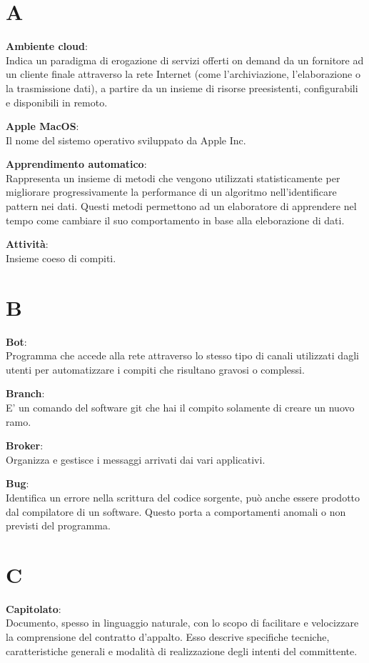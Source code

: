 \documentclass[a4paper, oneside, openany, dvipsnames, table]{article}
\begin{document}
\copertina{}


\newpage
\tableofcontents
\newpage


\newpage
\section{A}
\textbf{Ambiente cloud}:\\	 Indica un paradigma di erogazione di servizi offerti on demand da un fornitore ad un cliente finale attraverso la rete Internet (come l'archiviazione, l'elaborazione o la trasmissione dati), a partire da un insieme di risorse preesistenti, configurabili e disponibili in remoto.

\textbf{Apple MacOS}:\\Il nome del sistemo operativo sviluppato da Apple Inc.

\textbf{Apprendimento automatico}:\\	Rappresenta un insieme di metodi che vengono utilizzati statisticamente per migliorare progressivamente la performance di un algoritmo nell'identificare pattern nei dati. Questi metodi  permettono ad un elaboratore di apprendere nel tempo come cambiare il suo comportamento in base alla eleborazione di dati.

\textbf{Attività}:\\	Insieme coeso di compiti.


\newpage
\section{B}
\textbf{Bot}:\\	Programma che accede alla rete attraverso lo stesso tipo di canali utilizzati dagli utenti per automatizzare i compiti che risultano gravosi o complessi.

\textbf{Branch}:\\	E' un comando del software git che hai il compito solamente di creare un nuovo ramo.

\textbf{Broker}:\\	 Organizza e gestisce i messaggi arrivati dai vari applicativi.

\textbf{Bug}:\\	Identifica un errore nella scrittura del codice sorgente, può anche essere prodotto dal compilatore di un software. Questo porta a comportamenti anomali o non previsti del programma.


\newpage
\section{C}
\textbf{Capitolato}:\\	Documento, spesso in linguaggio naturale, con lo scopo di facilitare e velocizzare la comprensione del contratto d'appalto. Esso descrive specifiche tecniche, caratteristiche generali e modalità di realizzazione degli intenti del committente.
\end{document}
